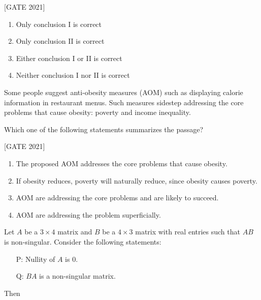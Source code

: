 \hfill{[GATE 2021]}\begin{multicols}{2}
    \begin{enumerate}
        \item Only conclusion I is correct
        \item Only conclusion II is correct
        \item Either conclusion I or II is correct
        \item Neither conclusion I nor II is correct
    \end{enumerate}
\end{multicols}

\item Some people suggest anti-obesity measures (AOM) such as displaying calorie information in restaurant menus. Such measures sidestep addressing the core problems that cause obesity: poverty and income inequality.

Which one of the following statements summarizes the passage?


\hfill{[GATE 2021]}
    \begin{enumerate}
        \item The proposed AOM addresses the core problems that cause obesity.
        \item If obesity reduces, poverty will naturally reduce, since obesity causes poverty.  \item AOM are addressing the core problems and are likely to succeed.
        \item AOM are addressing the problem superficially.
    \end{enumerate}

\item  Let $ A $ be a $ 3 \times 4 $ matrix and $ B $ be a $ 4 \times 3 $ matrix with real entries such that $ AB $ is non-singular. Consider the following statements:

\begin{enumerate}
    \item[P:] Nullity of $ A $ is 0.
    \item[Q:] $ BA $ is a non-singular matrix.
\end{enumerate}

 Then

